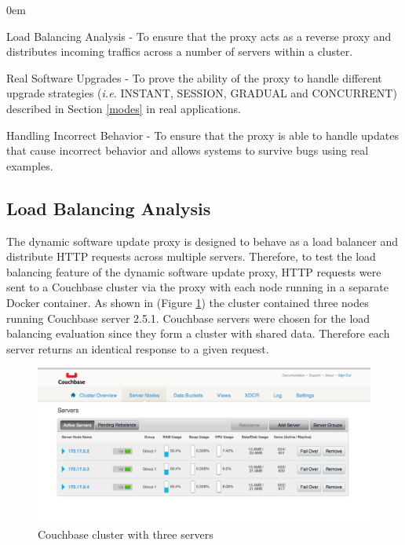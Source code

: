 \documentclass[a4paper,11pt,twoside]{report}
\begin{document}
\begin{list}{-}{}
  \itemsep0em
  \item{Load Balancing Analysis} - To ensure that the proxy acts as a reverse proxy and distributes incoming traffics across a number of servers within a cluster. 

  \item{Real Software Upgrades} - To prove the ability of the proxy to handle different upgrade strategies (\textit{i.e.} INSTANT, SESSION, GRADUAL and CONCURRENT) described in Section \ref{modes} in real applications. 
  
   \item{Handling Incorrect Behavior} - To ensure that the proxy is able to handle updates that cause incorrect behavior and allows systems to survive bugs using real examples. 
\end{list} 

\subsection{Load Balancing Analysis}
The dynamic software update proxy is designed to behave as a load balancer and distribute  HTTP requests across multiple servers. Therefore, to test the load balancing feature of the dynamic software update proxy, HTTP requests were sent to a Couchbase cluster via the proxy with each node running in a separate Docker container. As shown in (Figure \ref{couchbase_cluster}) the cluster contained three nodes running Couchbase server 2.5.1.  Couchbase servers were chosen for the load balancing evaluation since they form a cluster with shared data. Therefore each server returns an identical response to a given request.

\begin{figure}[!ht]
  \centering
     \includegraphics[scale=0.40]{couchbase_cluster}
  \caption{Couchbase cluster with three servers}
  \label{couchbase_cluster}
\end{figure} 
\end{document}
